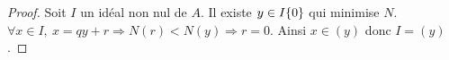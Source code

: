 \begin{proof}
 Soit $I$ un idéal non nul de $A$. Il existe $y\in I\-\{0\}$ qui minimise $N$.\\
$\forall x \in I,\ x=qy +r \Rightarrow N(r) < N(y) \Rightarrow r=0$. Ainsi
$x\in (y)$ donc $I = (y)$.
\end{proof}

























































